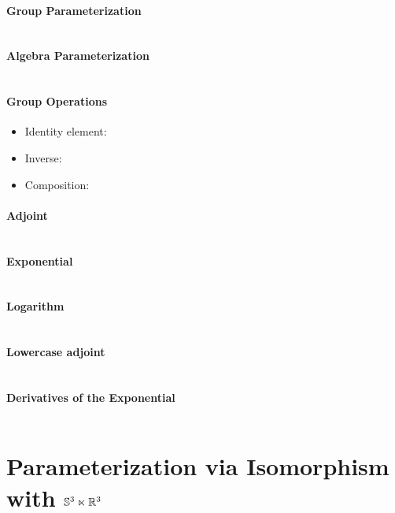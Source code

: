 \begin{properties}[breakable, title={Formulas for $\SEthree$}]
  \paragraph{Group Parameterization}
  \begin{equation}
  \end{equation}

  \paragraph{Algebra Parameterization}
  \begin{equation}
  \end{equation}

  \paragraph{Group Operations}
  \begin{itemize}
    \item Identity element:
    \item Inverse:
    \item Composition:
  \end{itemize}

  \paragraph{Adjoint}
  \begin{equation}
  \end{equation}

  \paragraph{Exponential}
  \begin{equation}
  \end{equation}

  \paragraph{Logarithm}
  \begin{equation}
  \end{equation}

  \paragraph{Lowercase adjoint}
  \begin{equation}
  \end{equation}

  \paragraph{Derivatives of the Exponential}
  \begin{equation}
  \end{equation}
\end{properties}

\section{Parameterization via Isomorphism with \texorpdfstring{${\mathbb{S}^3} \ltimes \mathbb{R}^{3}$}{S3 |x R3}}

